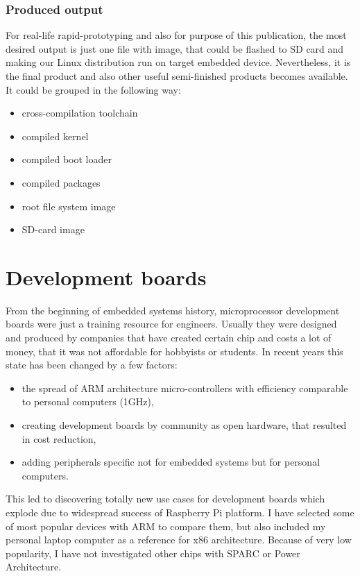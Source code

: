 \documentclass[printmode]{mgr}
\begin{document}
\subsection*{Produced output}

For real-life rapid-prototyping and also for purpose of this publication, the most desired output is just one file with image, that could be flashed to SD card and making our Linux distribution run on target embedded device. Nevertheless, it is the final product and also other useful semi-finished products becomes available. It could be grouped in the following way:

\begin{itemize}
    \item cross-compilation toolchain
    \item compiled kernel
    \item compiled boot loader
    \item compiled packages
    \item root file system image
    \item SD-card image
\end{itemize}



















\chapter{Development boards}
\label{section:development-boards}

From the beginning of embedded systems history, microprocessor development boards were just a training resource for engineers.
Usually they were designed and produced by companies that have created certain chip and costs a lot of money, that it was not affordable for hobbyists or students.
In recent years this state has been changed by a few factors:
\begin{itemize}
  \item the spread of ARM architecture micro-controllers with efficiency comparable to personal computers (1GHz),
  \item creating development boards by community as open hardware, that resulted in cost reduction,
  \item adding peripherals specific not for embedded systems but for personal computers.
\end{itemize}
This led to discovering totally new use cases for development boards which explode due to widespread success of Raspberry Pi platform.
I have selected some of most popular devices with ARM to compare them, but also included my personal laptop computer as a reference for x86 architecture. Because of very low popularity, I  have not investigated other chips with SPARC or Power Architecture.
\end{document}
